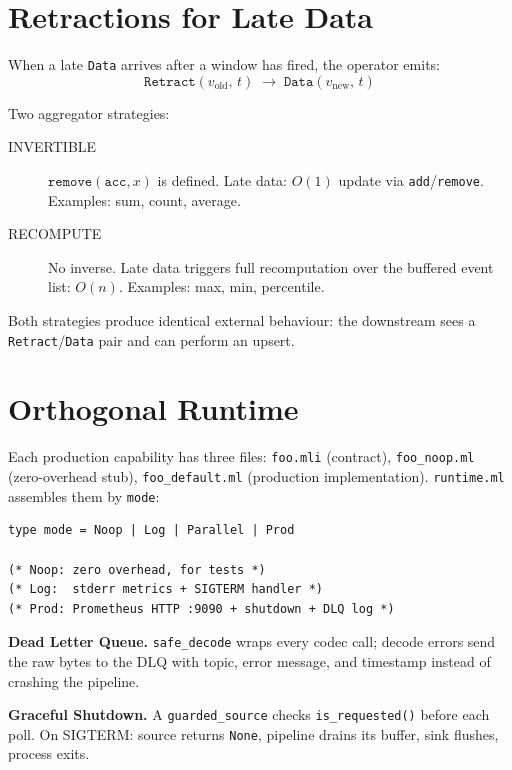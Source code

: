 \documentclass[11pt,a4paper]{article}
\begin{document}
\section{Retractions for Late Data}

When a late \texttt{Data} arrives after a window has fired, the
operator emits:
\[
  \mathtt{Retract}(v_\text{old},\, t) \;\to\; \mathtt{Data}(v_\text{new},\, t)
\]

Two aggregator strategies:

\begin{description}
\item[INVERTIBLE] $\mathtt{remove}(\mathtt{acc}, x)$ is defined.
  Late data: $O(1)$ update via \texttt{add}/\texttt{remove}.
  Examples: sum, count, average.
\item[RECOMPUTE] No inverse. Late data triggers full recomputation
  over the buffered event list: $O(n)$.
  Examples: max, min, percentile.
\end{description}

Both strategies produce identical external behaviour: the downstream
sees a \texttt{Retract}/\texttt{Data} pair and can perform an upsert.

\section{Orthogonal Runtime}

Each production capability has three files:
\texttt{foo.mli} (contract), \texttt{foo\_noop.ml} (zero-overhead stub),
\texttt{foo\_default.ml} (production implementation).
\texttt{runtime.ml} assembles them by \texttt{mode}:

\begin{lstlisting}
type mode = Noop | Log | Parallel | Prod

(* Noop: zero overhead, for tests *)
(* Log:  stderr metrics + SIGTERM handler *)
(* Prod: Prometheus HTTP :9090 + shutdown + DLQ log *)
\end{lstlisting}

\textbf{Dead Letter Queue.} \texttt{safe\_decode} wraps every codec
call; decode errors send the raw bytes to the DLQ with topic, error
message, and timestamp instead of crashing the pipeline.

\textbf{Graceful Shutdown.} A \texttt{guarded\_source} checks
\texttt{is\_requested()} before each poll. On SIGTERM: source returns
\texttt{None}, pipeline drains its buffer, sink flushes, process exits.
\end{document}
